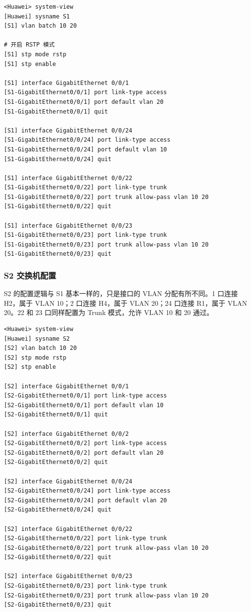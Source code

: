 \documentclass[a4paper]{article}
\begin{document}
\begin{lstlisting}[language=HuaweiConfig, caption={S1 基础配置}]
<Huawei> system-view
[Huawei] sysname S1
[S1] vlan batch 10 20

# 开启 RSTP 模式
[S1] stp mode rstp
[S1] stp enable

[S1] interface GigabitEthernet 0/0/1
[S1-GigabitEthernet0/0/1] port link-type access
[S1-GigabitEthernet0/0/1] port default vlan 20
[S1-GigabitEthernet0/0/1] quit

[S1] interface GigabitEthernet 0/0/24
[S1-GigabitEthernet0/0/24] port link-type access
[S1-GigabitEthernet0/0/24] port default vlan 10
[S1-GigabitEthernet0/0/24] quit

[S1] interface GigabitEthernet 0/0/22
[S1-GigabitEthernet0/0/22] port link-type trunk
[S1-GigabitEthernet0/0/22] port trunk allow-pass vlan 10 20
[S1-GigabitEthernet0/0/22] quit

[S1] interface GigabitEthernet 0/0/23
[S1-GigabitEthernet0/0/23] port link-type trunk
[S1-GigabitEthernet0/0/23] port trunk allow-pass vlan 10 20
[S1-GigabitEthernet0/0/23] quit
\end{lstlisting}

\subsubsection{S2 交换机配置}
S2 的配置逻辑与 S1 基本一样的，只是接口的 VLAN 分配有所不同。1 口连接 H2，属于 VLAN 10；2 口连接 H4，属于 VLAN 20；24 口连接 R1，属于 VLAN 20。22 和 23 口同样配置为 Trunk 模式，允许 VLAN 10 和 20 通过。

\begin{lstlisting}[language=HuaweiConfig, caption={S2 基础配置}]
<Huawei> system-view
[Huawei] sysname S2
[S2] vlan batch 10 20
[S2] stp mode rstp
[S2] stp enable

[S2] interface GigabitEthernet 0/0/1
[S2-GigabitEthernet0/0/1] port link-type access
[S2-GigabitEthernet0/0/1] port default vlan 10
[S2-GigabitEthernet0/0/1] quit

[S2] interface GigabitEthernet 0/0/2
[S2-GigabitEthernet0/0/2] port link-type access
[S2-GigabitEthernet0/0/2] port default vlan 20
[S2-GigabitEthernet0/0/2] quit

[S2] interface GigabitEthernet 0/0/24
[S2-GigabitEthernet0/0/24] port link-type access
[S2-GigabitEthernet0/0/24] port default vlan 20
[S2-GigabitEthernet0/0/24] quit

[S2] interface GigabitEthernet 0/0/22
[S2-GigabitEthernet0/0/22] port link-type trunk
[S2-GigabitEthernet0/0/22] port trunk allow-pass vlan 10 20
[S2-GigabitEthernet0/0/22] quit

[S2] interface GigabitEthernet 0/0/23
[S2-GigabitEthernet0/0/23] port link-type trunk
[S2-GigabitEthernet0/0/23] port trunk allow-pass vlan 10 20
[S2-GigabitEthernet0/0/23] quit
\end{lstlisting}
\end{document}

